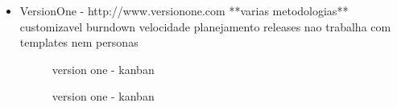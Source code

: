 \begin{itemize}
\item VersionOne - http://www.versionone.com
**varias metodologias**
customizavel
burndown
velocidade
planejamento releases
nao trabalha com templates nem personas

\begin{figure}[htbp]
  \centering
  \caption{version one - kanban}
\end{figure}

\begin{figure}[htbp]
  \centering
  \caption{version one - kanban}
\end{figure}


\end{itemize}
